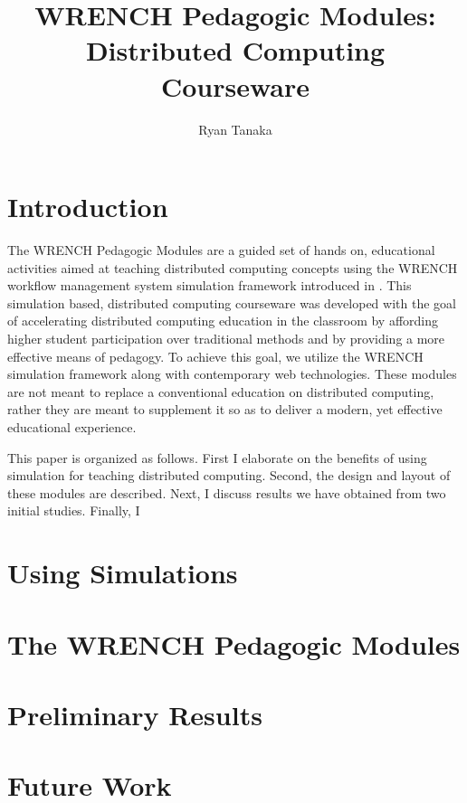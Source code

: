 \documentclass{article}
\begin{document}
\title{WRENCH Pedagogic Modules: Distributed Computing Courseware}
\author{Ryan Tanaka}

\maketitle

\section{Introduction}
The WRENCH Pedagogic Modules are a guided set of hands on, educational
activities aimed at teaching distributed computing concepts using the
WRENCH workflow management system simulation framework introduced in \cite{wrench}. This simulation
based, distributed computing courseware was developed with the goal
of accelerating distributed computing education in the classroom by affording
higher student participation over traditional methods and by providing a
more effective means of pedagogy. To achieve this goal, we utilize the WRENCH
simulation framework along with contemporary web technologies. These modules are 
not meant to replace a conventional education on distributed computing, rather 
they are meant to supplement it so as to deliver a modern, yet effective educational 
experience. 


This paper is organized as follows. First I elaborate on the benefits of using simulation for teaching 
distributed computing. Second, the design and layout of these modules are described. Next, I discuss
results we have obtained from two initial studies. Finally, I 


\section{Using Simulations}

\section{The WRENCH Pedagogic Modules}

\section{Preliminary Results}

\section{Future Work}



\end{document}
